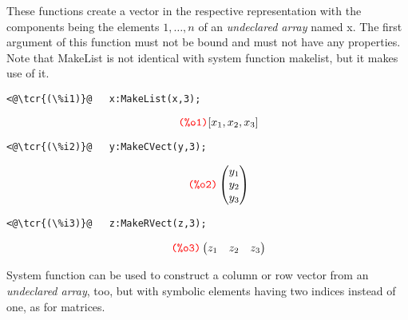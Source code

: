\documentclass[../Maxima_Workbook.tex]{subfiles}
\begin{document}
\lz {} \hfill {}

 \hfill {}

 \hfill {}

\lz These functions create a vector in the respective representation with the components being the elements $ 1,\dots,n $ of an \emph{undeclared array} named x. The first argument of this function must not be bound and must not have any properties. Note that MakeList is not identical with system function makelist, but it makes use of it.

\lz \begin{small}
\color{blue}
\begin{lstlisting}
<@\tcr{(\%i1)}@   x:MakeList(x,3);
\end{lstlisting}
\vspace{-6mm} \[\tag*{\tcr{\ttfamily (\%o1)}} [x_1, x_2, x_3] \]
\vspace{-10mm} \begin{lstlisting}
<@\tcr{(\%i2)}@   y:MakeCVect(y,3);
\end{lstlisting}
\vspace{-5mm} \[\tag*{\tcr{\ttfamily (\%o2)}} \begin{pmatrix} y_1 \\ y_2 \\ y_3 \end{pmatrix} \]
\vspace{-6mm} \begin{lstlisting}
<@\tcr{(\%i3)}@   z:MakeRVect(z,3);
\end{lstlisting}
\vspace{-5mm} \[\tag*{\tcr{\ttfamily (\%o3)}} \begin{pmatrix} z_1 & z_2 & z_3 \end{pmatrix} \]
\color{black}
\end{small}

\vspace{-4mm} System function  can be used to construct a column or row vector from an \emph{undeclared array}, too, but with symbolic elements having two indices instead of one, as for matrices.
\end{document}
